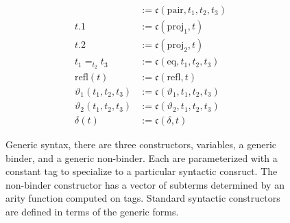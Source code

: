 \begin{figure}
\begin{minipage}{0.5\textwidth}
        \begin{align*}
            [t_1, t_2; t_3] &:= \mathfrak{c}(\text{pair}, t_1, t_2, t_3) \\
            t.1 &:= \mathfrak{c}(\text{proj}_1, t) \\
            t.2 &:= \mathfrak{c}(\text{proj}_2, t) \\
            t_1 =_{t_2} t_3 &:= \mathfrak{c}(\text{eq}, t_1, t_2, t_3) \\
            \text{refl}(t) &:= \mathfrak{c}(\text{refl}, t) \\
            \vartheta_1(t_1, t_2, t_3) &:= \mathfrak{c}(\vartheta_1, t_1, t_2, t_3) \\
            \vartheta_2(t_1, t_2, t_3) &:= \mathfrak{c}(\vartheta_2, t_1, t_2, t_3) \\
            \delta(t) &:= \mathfrak{c}(\delta, t)
        \end{align*}
    \end{minipage}
    \vspace{-.05in}
    \caption{Generic syntax, there are three constructors, variables, a generic binder, and a generic non-binder. Each are parameterized with a constant tag to specialize to a particular syntactic consruct. The non-binder constructor has a vector of subterms determined by an arity function computed on tags. Standard syntactic constructors are defined in terms of the generic forms.}
    \label{fig:syntax}
\end{figure}
